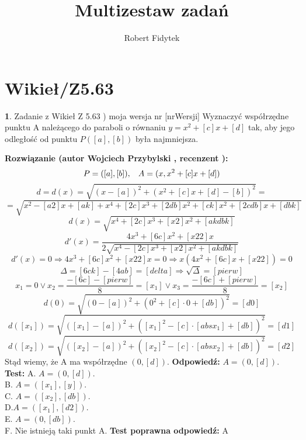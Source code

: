 \documentclass[12pt, a4paper]{article}
\title{Multizestaw zadań}
\author{Robert Fidytek}
\date{}
\theoremstyle{definition} %
\newtheorem{zad}{}
\newcommand{\kategoria}[1]{\section{#1}} %
\newcommand{\zadStart}[1]{\begin{zad}#1\newline} %
\newcommand{\zadStop}{\end{zad}}   %
\newcommand{\rozwStart}[2]{\noindent \textbf{Rozwiązanie (autor #1 , recenzent #2): }\newline} %
\newcommand{\rozwStop}{\newline}                                            %
\newcommand{\odpStart}{\noindent \textbf{Odpowiedź:}\newline}    %
\newcommand{\odpStop}{\newline}                                             %
\newcommand{\testStart}{\noindent \textbf{Test:}\newline} %
\newcommand{\testStop}{\newline} %
\newcommand{\kluczStart}{\noindent \textbf{Test poprawna odpowiedź:}\newline} %
\newcommand{\kluczStop}{\newline} %
\begin{document}
\maketitle


\kategoria{Wikieł/Z5.63}
\zadStart{Zadanie z Wikieł Z 5.63 ) moja wersja nr [nrWersji]}
Wyznaczyć współrzędne punktu A należącego do paraboli o równaniu $y=x^{2}+[c]x+[d]$ tak, aby jego odległość od punktu $P([a],[b])$ była najmniejsza.
\zadStop
\rozwStart{Wojciech Przybylski}{}
$$P=([a],[b]),\hspace{3mm} A=(x, x^{2}+[c]x+[d])$$
$$d=d(x)=\sqrt{(x-[a])^{2}+(x^{2}+[c]x+[d]-[b])^{2}}=$$
$$=\sqrt{x^{2}-[a2]x+[ak]+x^{4}+[2c]x^{3}+[2db]x^{2}+[ck]x^{2}+[2cdb]x+[dbk]}$$
$$d(x)=\sqrt{x^{4}+[2c]x^{3}+[x2]x^{2}+[akdbk]}$$
$$d'(x)=\frac{4x^{3}+[6c]x^{2}+[x22]x}{2\sqrt{x^{4}-[2c]x^{3}+[x2]x^{2}+[akdbk]}}$$
$$d'(x)=0 \Rightarrow 4x^{3}+[6c]x^{2}+[x22]x=0 \Rightarrow x(4x^{2}+[6c]x+[x22])=0$$
$$\Delta=[6ck]-[4ab]=[delta] \Rightarrow \sqrt{\Delta}=[pierw]$$
$$x_{1}=0\vee x_{2}=\frac{-[6c]-[pierw]}{8}=[x_1] \vee x_{3}=\frac{-[6c]+[pierw]}{8}=[x_2]$$
$$d(0)=\sqrt{(0-[a])^{2}+(0^{2}+[c]\cdot 0+[db])^{2}}=[d0]$$
$$d([x_1])=\sqrt{([x_1]-[a])^{2}+([x_1]^{2}-[c]\cdot [absx_1]+[db])^{2}}=[d1]$$
$$d([x_2])=\sqrt{([x_2]-[a])^{2}+([x_2]^{2}-[c]\cdot [absx_2]+[db])^{2}}=[d2]$$
Stąd wiemy, że A ma współrzędne $(0,[d])$.
\rozwStop
\odpStart
$A=(0,[d])$.
\odpStop
\testStart
A. $A=(0,[d])$.\\
B. $A=([x_1],[y])$.\\
C. $A=([x_2],[db])$.\\
D.$A=([x_1],[d2])$.\\
E. $A=(0,[db])$.\\
F. Nie istnieją taki punkt A.
\testStop
\kluczStart
A
\kluczStop
\end{document}
